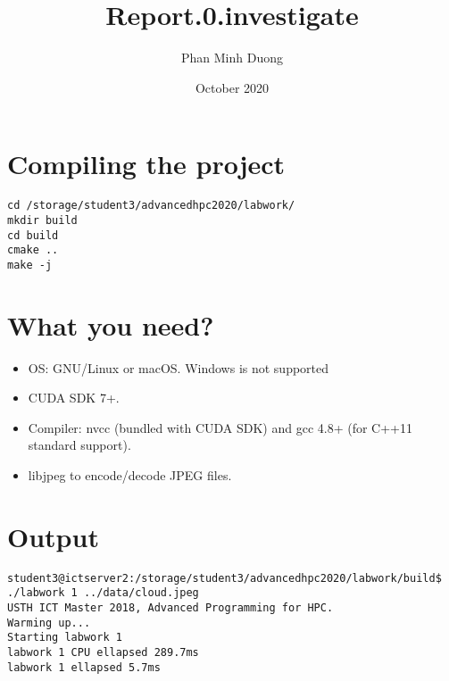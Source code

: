 \documentclass{article}
\title{Report.0.investigate}
\author{Phan Minh Duong}
\date{October 2020}
\begin{document}
\maketitle

\section{Compiling the project}
\begin{verbatim}
cd /storage/student3/advancedhpc2020/labwork/
mkdir build
cd build
cmake ..
make -j
\end{verbatim}
\section{What you need?}
\begin{itemize}
  \item OS: GNU/Linux or macOS. Windows is not supported
  \item CUDA SDK 7+.
  \item Compiler: nvcc (bundled with CUDA SDK) and gcc 4.8+ (for C++11 standard support).
  \item libjpeg to encode/decode JPEG files.
\end{itemize}
\section{Output}
\begin{verbatim}
student3@ictserver2:/storage/student3/advancedhpc2020/labwork/build$ ./labwork 1 ../data/cloud.jpeg
USTH ICT Master 2018, Advanced Programming for HPC.
Warming up...
Starting labwork 1
labwork 1 CPU ellapsed 289.7ms
labwork 1 ellapsed 5.7ms
\end{verbatim}
\end{document}
